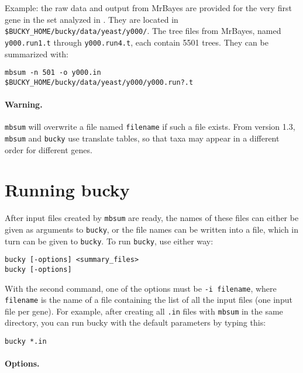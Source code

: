 \documentclass[12pt,english,final,letterpaper]{article}
\begin{document}
\noindent
Example: the raw data and output from MrBayes are provided for the
very first gene in the set analyzed in \cite{ane-etal-2008}.
They are located in \verb+$BUCKY_HOME/bucky/data/yeast/y000/+. 
The tree files from MrBayes, named \verb+y000.run1.t+ through
\verb+y000.run4.t+, each contain 5501 trees. 
They can be summarized with:
\begin{verbatim}
mbsum -n 501 -o y000.in    $BUCKY_HOME/bucky/data/yeast/y000/y000.run?.t
\end{verbatim}

\paragraph{Warning.}  
{\tt mbsum} will overwrite a file named \verb+filename+
if such a file exists.
From version 1.3, \texttt{mbsum} and \texttt{bucky} use translate tables,
so that taxa may appear in a different order for different genes.

\section{Running bucky}
After input files created by {\tt mbsum} are ready, the names of these
files can either be given as arguments to {\tt bucky}, or the file 
names can be written into a file, which in turn can be given to
{\tt bucky}. To run {\tt bucky}, use either way:
\begin{verbatim}
bucky [-options] <summary_files> 
bucky [-options]
\end{verbatim}
With the second command, one of the options must be 
{\tt -i filename}, where {\tt filename} is the name of a file
containing the list of all the input files (one input file per gene).
For example, after creating all {\tt .in} files with {\tt mbsum} in the same 
directory, you can run bucky with the default parameters by typing this:
\begin{verbatim}
bucky *.in
\end{verbatim}

\paragraph{Options.} \hspace{1cm}

\bigskip
\end{document}
